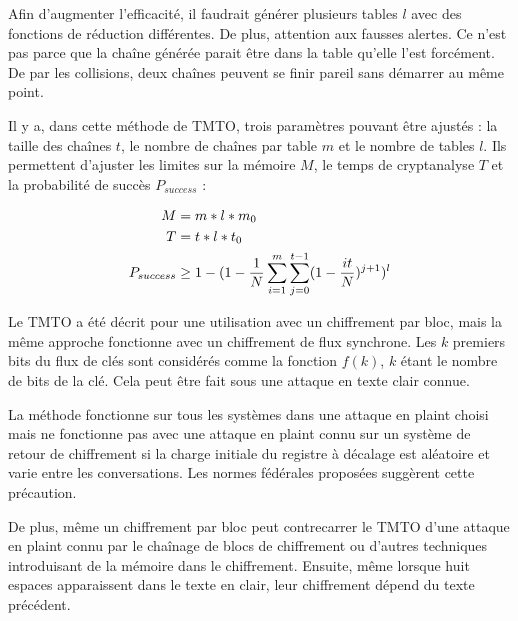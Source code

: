 		Afin d'augmenter l'efficacité, il faudrait générer plusieurs tables $l$ avec des fonctions de réduction différentes. De plus, attention aux fausses alertes. Ce n'est pas parce que la chaîne générée parait être dans la table qu'elle l'est forcément. De par les collisions, deux chaînes peuvent se finir pareil sans démarrer au même point.


		Il y a, dans cette méthode de \gls{TMTO}, trois paramètres pouvant être ajustés : la taille des chaînes $t$, le nombre de chaînes par table $m$ et le nombre de tables $l$. Ils permettent d'ajuster les limites sur la mémoire $M$, le temps de cryptanalyse $T$ et la probabilité de succès $P_{success}$\cite{Oech03} :

		\bigskip

		\begin{align*}
			M &= m*l*m_0\\
			T &= t*l*t_0\\
			P_{success} &\ge{} 1 - (1 - \frac{1}{N} \sum\limits_{i=1}^{m}\sum\limits_{j=0}^{t-1} (1 - \frac{it}{N})^{j+1})^l
		\end{align*}

		\bigskip

		Le \gls{TMTO} a été décrit pour une utilisation avec un chiffrement par bloc\cite{ehellman}, mais la même approche fonctionne avec un chiffrement de flux synchrone\cite{ehellman}. Les $k$ premiers bits du flux de clés sont considérés comme la fonction $f(k)$, $k$ étant le nombre de bits de la clé. Cela peut être fait sous une attaque en texte clair connue.

		\bigskip

		La méthode fonctionne sur tous les systèmes dans une attaque en \gls{plaint} choisi mais ne fonctionne pas avec une attaque en \gls{plaint} connu sur un système de retour de chiffrement si la charge initiale du registre à décalage est aléatoire et varie entre les conversations. Les normes fédérales proposées\cite{ehellman} suggèrent cette précaution.

		\bigskip

		De plus, même un chiffrement par bloc peut contrecarrer le \gls{TMTO} d'une attaque en \gls{plaint} connu par le chaînage de blocs de chiffrement ou d'autres techniques introduisant de la mémoire dans le chiffrement. Ensuite, même lorsque huit espaces apparaissent dans le texte en clair, leur chiffrement dépend du texte précédent.

		\bigskip

